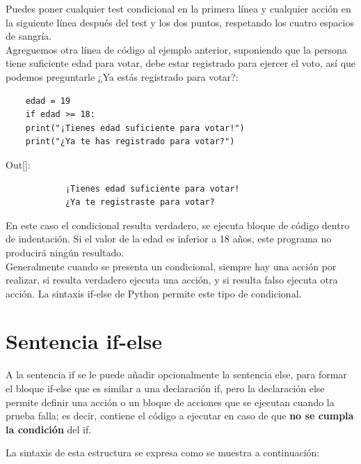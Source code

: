 Puedes poner cualquier test condicional en la primera línea y cualquier acción en la siguiente línea después del test y los dos puntos, respetando los cuatro espacios de sangría. \\

Agreguemos otra línea de código al ejemplo anterior, suponiendo que  la persona tiene suficiente edad para votar, debe estar registrado para ejercer el voto, así que podemos preguntarle ¿Ya estás registrado para votar?:

\hspace{-2.5cm}{\ttfamily \scriptsize votacion.py}\vspace{-0.5cm}
\begin{lstlisting}			
	edad = 19
	if edad >= 18:	
	print("¡Tienes edad suficiente para votar!")
	print("¿Ya te has registrado para votar?")
\end{lstlisting}
{\ttfamily\scriptsize\noindent Out[]:\vspace{-0.15cm}	
	{\color{blue} 
		\begin{verbatim}
			¡Tienes edad suficiente para votar!
			¿Ya te registraste para votar?
		\end{verbatim}
}}
En este caso el condicional resulta verdadero, se ejecuta bloque de código dentro de indentación.
Si el valor de la edad es inferior a 18 años, este programa no producirá ningún resultado.\\


Generalmente cuando se presenta un condicional, siempre hay una acción por realizar, si resulta verdadero ejecuta una acción, y si resulta falso ejecuta otra acción. La sintaxis {\ttfamily if-else} de Python permite este tipo de condicional.

\section{Sentencia {\ttfamily if-else}}

A la sentencia {\ttfamily if} se le puede añadir opcionalmente la sentencia {\ttfamily else}, para formar el bloque {\ttfamily if-else} que es similar a una declaración {\ttfamily if}, pero la declaración {\ttfamily else}  permite definir una acción o un bloque  de acciones que se ejecutan cuando la prueba falla; es decir,  contiene el código a ejecutar en caso de que {\bf no se cumpla la condición} del  {\ttfamily if}. 

La sintaxis de esta estructura se expresa como se muestra a continuación:

